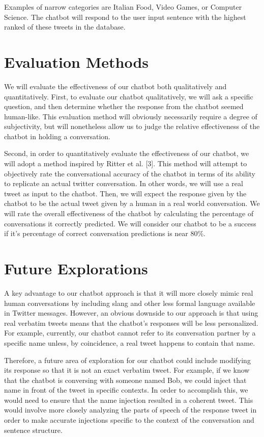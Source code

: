 \documentclass[letterpaper]{article} %
\begin{document}
Examples of narrow categories are Italian Food, Video Games, or Computer Science. The chatbot will respond to the user input sentence with the highest ranked of these tweets in the database.

\section{Evaluation Methods}
We will evaluate the effectiveness of our chatbot both qualitatively and quantitatively. First, to evaluate our chatbot qualitatively, we will ask a specific question, and then determine whether the response from the chatbot seemed human-like. This evaluation method will obviously necessarily require a degree of subjectivity, but will nonetheless allow us to judge the relative effectiveness of the chatbot in holding a conversation.

Second, in order to quantitatively evaluate the effectiveness of our chatbot, we will adopt a method inspired by Ritter et al. [3]. This method will attempt to objectively rate the conversational accuracy of the chatbot in terms of its ability to replicate an actual twitter conversation. In other words, we will use a real tweet as input to the chatbot. Then, we will expect the response given by the chatbot to be the actual tweet given by a human in a real world conversation. We will rate the overall effectiveness of the chatbot by calculating the percentage of conversations it correctly predicted. We will consider our chatbot to be a success if it's percentage of correct conversation predictions is near 80\%.

\section{Future Explorations}
A key advantage to our chatbot approach is that it will more closely mimic real human conversations by including slang and other less formal language available in Twitter messages. However, an obvious downside to our approach is that using real verbatim tweets means that the chatbot's responses will be less personalized. For example, currently, our chatbot cannot refer to its conversation partner by a specific name unless, by coincidence, a real tweet happens to contain that name.

Therefore, a future area of exploration for our chatbot could include modifying its response so that it is not an exact verbatim tweet. For example, if we know that the chatbot is conversing with someone named Bob, we could inject that name in front of the tweet in specific contexts. In order to accomplish this, we would need to ensure that the name injection resulted in a coherent tweet. This would involve more closely analyzing the parts of speech of the response tweet in order to make accurate injections specific to the context of the conversation and sentence structure.
\end{document}
